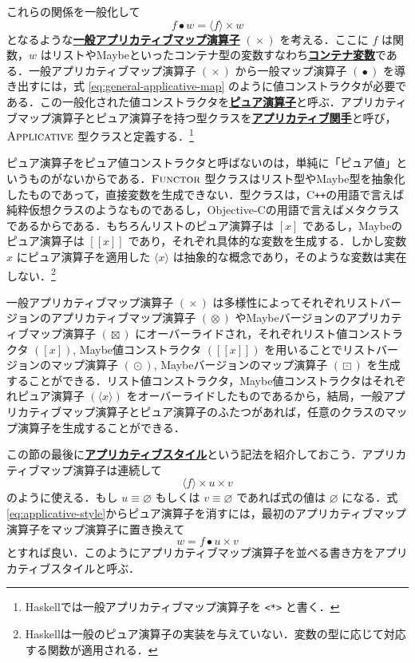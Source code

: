 \documentclass[a4paper,twocolumn]{jsbook}
\def\[{\left[\!\left[}
\def\]{\right]\!\right]}
\newcommand{\programminglanguage}[1]{\textsf{#1}}
\newcommand{\cxx}{\programminglanguage{C}\texttt{++}}
\newcommand{\haskell}{\programminglanguage{Haskell}}
\newcommand{\objectivec}{\programminglanguage{Objective-C}}
\newcommand{\keyword}[1]{{\underline{\textbf{#1}}}}
\newcommand{\code}[1]{\texttt{#1}}
\newcommand{\mPureNothing}{\varnothing}
\DeclareMathOperator{\mAppMap}{\times}
\DeclareMathOperator{\mAppMapList}{\otimes}
\DeclareMathOperator{\mAppMapMaybe}{\boxtimes}
\DeclareMathOperator{\mMap}{\bullet}
\DeclareMathOperator{\mMapList}{\odot}
\DeclareMathOperator{\mMapMaybe}{\boxdot}
\newcommand{\mListWith}[1]{\left[#1\right]}
\newcommand{\mMaybeWith}[1]{\[#1\]}
\newcommand{\mPureWith}[1]{\langle#1\rangle}
\newcommand{\mSpecialTypeClass}[1]{\textsc{#1}} %
\newcommand{\mApplicativeTypeClass}{\mSpecialTypeClass{Applicative}}
\newcommand{\mFunctorTypeClass}{\mSpecialTypeClass{Functor}}
\begin{document}
これらの関係を一般化して
\begin{equation}
\label{eq:general-applicative-map}
f\mMap w=\mPureWith{f}\mAppMap w
\end{equation}
となるような\keyword{一般アプリカティブマップ演算子} $(\mAppMap)$ を考える．ここに $f$ は関数，$w$ はリストやMaybeといったコンテナ型の変数すなわち\keyword{コンテナ変数}である．一般アプリカティブマップ演算子 $(\mAppMap)$ から一般マップ演算子 $(\mMap)$ を導き出すには，式 \eqref{eq:general-applicative-map} のように値コンストラクタが必要である．この一般化された値コンストラクタを\keyword{ピュア演算子}と呼ぶ．アプリカティブマップ演算子とピュア演算子を持つ型クラスを\keyword{アプリカティブ関手}と呼び，$\mApplicativeTypeClass$ 型クラスと定義する．\footnote{\haskell では一般アプリカティブマップ演算子を \code{<*>} と書く．}

ピュア演算子をピュア値コンストラクタと呼ばないのは，単純に「ピュア値」というものがないからである．$\mFunctorTypeClass$ 型クラスはリスト型やMaybe型を抽象化したものであって，直接変数を生成できない．型クラスは，\cxx の用語で言えば純粋仮想クラスのようなものであるし，\objectivec の用語で言えばメタクラスであるからである．もちろんリストのピュア演算子は $\mListWith{x}$ であるし，Maybeのピュア演算子は $\mMaybeWith{x}$ であり，それぞれ具体的な変数を生成する．しかし変数 $x$ にピュア演算子を適用した $\mPureWith{x}$ は抽象的な概念であり，そのような変数は実在しない．\footnote{\haskell は一般のピュア演算子の実装を与えていない．変数の型に応じて対応する関数が適用される．}

一般アプリカティブマップ演算子 $(\mAppMap)$ は多様性によってそれぞれリストバージョンのアプリカティブマップ演算子 $(\mAppMapList)$ やMaybeバージョンのアプリカティブマップ演算子 $(\mAppMapMaybe)$ にオーバーライドされ，それぞれリスト値コンストラクタ $(\mListWith{x})$, Maybe値コンストラクタ $(\mMaybeWith{x})$ を用いることでリストバージョンのマップ演算子 $(\mMapList)$, Maybeバージョンのマップ演算子 $(\mMapMaybe)$ を生成することができる．リスト値コンストラクタ，Maybe値コンストラクタはそれぞれピュア演算子 $(\mPureWith{x})$ をオーバーライドしたものであるから，結局，一般アプリカティブマップ演算子とピュア演算子のふたつがあれば，任意のクラスのマップ演算子を生成することができる．

この節の最後に\keyword{アプリカティブスタイル}という記法を紹介しておこう．アプリカティブマップ演算子は連続して
\begin{equation}
\label{eq:applicative-style}
\mPureWith{f}\mAppMap u\mAppMap v
\end{equation}
のように使える．もし $u\equiv\mPureNothing$ もしくは $v\equiv\mPureNothing$ であれば式の値は $\mPureNothing$ になる．式\eqref{eq:applicative-style}からピュア演算子を消すには，最初のアプリカティブマップ演算子をマップ演算子に置き換えて
\begin{equation}
w=f\mMap u\mAppMap v
\end{equation}
とすれば良い．このようにアプリカティブマップ演算子を並べる書き方をアプリカティブスタイルと呼ぶ．
\end{document}
